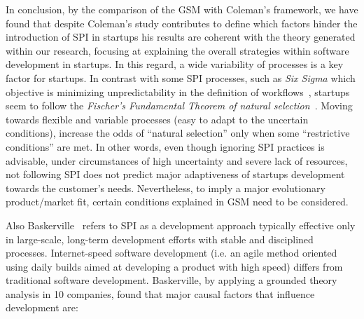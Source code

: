 \documentclass[10pt,journal,letterpaper,compsoc]{IEEEtran}
\begin{document}
In conclusion, by the comparison of the GSM with Coleman's framework, we have
found that despite Coleman's study contributes to define which factors hinder
the introduction of SPI in startups %
his results are coherent with the theory generated within our research, focusing
at explaining the overall strategies within software development in startups.
In this regard, a wide variability of processes is a key factor for startups.  
In contrast with some SPI processes, such as \textit{Six Sigma} which objective 
is minimizing unpredictability in the definition of workflows~\cite{Sixsigma}, 
startups seem to follow the \textit{Fischer's Fundamental Theorem of natural  
selection}~\cite{Fisher}.
Moving towards flexible and variable processes (easy to adapt to the uncertain
conditions), increase the odds of ``natural selection'' only when some
``restrictive conditions'' are met. In other words, even though ignoring SPI
practices is advisable, under circumstances of high uncertainty and severe lack
of resources, %
not following SPI does not predict major adaptiveness of startups development 
towards the customer's needs. Nevertheless, to imply a major evolutionary 
product/market fit, certain conditions explained in GSM need to be considered.



Also Baskerville~\cite{Internet} refers to SPI as a development approach
typically effective only in large-scale, long-term development efforts with
stable and disciplined processes. Internet-speed software development (i.e. an
agile method oriented using daily builds aimed at developing a product with high
speed) differs from traditional software development. Baskerville, by applying a
grounded theory analysis in 10 companies, found that major causal factors that
influence development are:
\end{document}
